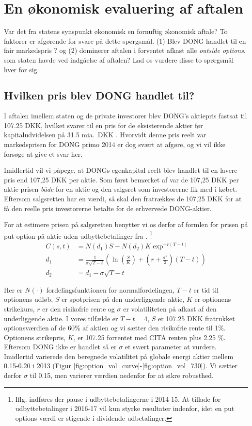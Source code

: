 \documentclass{article}
\begin{document}
\section{En økonomisk evaluering af aftalen}

Var det fra statens synspunkt økonomisk en fornuftig økonomisk aftale? To faktorer er afgørende for svare på dette spørgsmål. (1) Blev DONG handlet til en fair markedspris ? og (2) dominerer aftalen i forventet afkast  alle \emph{outside options}, som staten havde ved indgåelse af aftalen? Lad os vurdere disse to spørgsmål hver for sig.

\subsection{Hvilken pris blev DONG handlet til?}

I aftalen imellem staten og de private investorer blev  DONG's aktiepris fastsat til 107.25 DKK, hvilket svarer til en pris for de eksisterende aktier før kapitaludvidelsen på 31.5 mia.\ DKK \citep{FM2013a}. Hvorvidt denne pris reelt var markedsprisen for DONG primo 2014 er dog svært at afgøre, og vi vil ikke forsøge at give et svar her. 

Imidlertid vil vi påpege, at DONGs egenkapital reelt blev handlet til en lavere pris end 107,25 DKK per aktie. Som først bemærket af \cite{Moeller2014} var de 107,25 DKK per aktie prisen \emph{både} for en aktie og den salgsret som investorerne fik med i købet. Eftersom salgsretten har en værdi, så skal den fratrækkes de 107,25 DKK for at få den reelle pris investorerne betalte for de erhvervede DONG-aktier.

For at estimere prisen på salgsretten benytter vi os derfor af formlen for prisen på put-option på aktie uden udbyttebetalinger fra \cite{Black1973}. \footnote{Iflg. \cite{FM2013a} indføres der pause i udbyttebetalingerne i 2014-15. At tillade for udbyttebetalinger i 2016-17 vil kun styrke resultater indenfor, idet en put options værdi er stigende i dividende udbetalinger.} 
	\begin{align}
C(s,t)&=N(d_1)S-N(d_2)K \exp^{-r(T-t)} \\
d_1&= \frac{1}{\sigma\sqrt{T-t}}\left( \ln\left( \frac{S}{K} \right)+\left(r+\frac{\sigma^2}{2} \right)(T-t) \right) \nonumber \\
d_2&=d_1-\sigma \sqrt{T-t} \nonumber
\end{align}

Her er $N(\cdot)$ fordelingsfunktionen for normalfordelingen, $T-t$ er tid til optionens udløb, $S$ er spotprisen på den underliggende aktie, $K$ er optionens strikekurs, $r$ er den risikofrie rente og $\sigma$ er volatiliteten på afkast af den underliggende aktie. I vores tilfælde er $T-t=4$, $S$ er 107.25 DKK fratrukket optionsværdien af de 60\% af aktien og vi sætter den risikofrie rente til 1\%. Optionens strikepris, $K$, er 107.25 forrentet med CITA renten plus 2.25 \%. Eftersom DONG ikke er handlet så er $\sigma$ et svært parameter at vurdere. Imidlertid varierede den  beregnede volatilitet på globale energi aktier mellem 0.15-0.20 i 2013 (Figur \ref{fig:option_vol_curve}-\ref{fig:option_vol_730}). Vi sætter derfor $\sigma$ til 0.15, men varierer værdien nedenfor for at sikre robusthed. 
\end{document}

